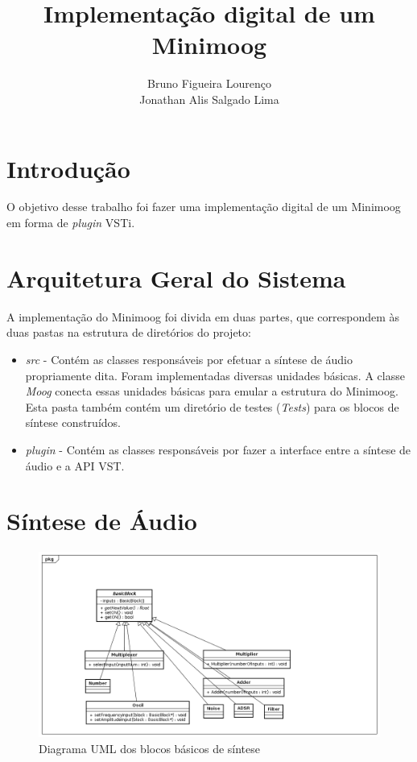 \documentclass{article}
\title{Implementação digital de um Minimoog}
\author{Bruno Figueira Lourenço \\ Jonathan Alis Salgado Lima}
\begin{document}
\maketitle

\section{Introdução}


O objetivo desse trabalho foi fazer uma implementação digital de um Minimoog em forma de \emph{plugin} VSTi.



\section{Arquitetura Geral do Sistema}



A implementação do Minimoog foi divida em duas partes, que correspondem às 
duas pastas na estrutura de diretórios do projeto:

\begin{itemize}
	\item \emph{src} - Contém as classes responsáveis por efetuar 
	a síntese de áudio propriamente dita. Foram implementadas diversas 
	unidades básicas. A classe \emph{Moog} conecta essas unidades básicas para 
	emular a estrutura do Minimoog. Esta pasta também contém um diretório 
	de testes (\emph{Tests}) para os blocos de síntese construídos.
	\item \emph{plugin} - Contém as classes responsáveis por fazer a 
	interface entre a síntese de áudio e a API VST.
\end{itemize}

\section{Síntese de Áudio}


\begin{figure}
\centering
\includegraphics[scale=0.4]{Classes.png}\caption{Diagrama UML dos blocos básicos de síntese}\label{fig:uml1}
\end{figure}
\end{document}
